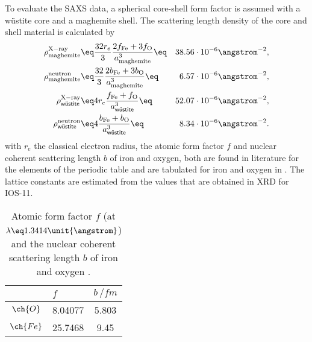 \documentclass[\main/dresen_thesis.tex]{subfiles}
\begin{document}
    To evaluate the SAXS data, a spherical core-shell form factor is assumed with a w\"ustite core and a maghemite shell.
    The scattering length density of the core and shell material is calculated by
    \begin{align}
      \rho^\mathrm{X-ray}_\mathrm{maghemite}   &\eq   \frac{32 r_e}{3}  \frac{2 f_\mathrm{Fe} + 3 f_\mathrm{O}}
                                                                  {a_\mathrm{maghemite}^3}
                                                \eq & 38.56 \cdot 10^{-6} \angstrom^{-2},\\
      \rho^\mathrm{neutron}_\mathrm{maghemite} &\eq   \frac{32}{3} \frac{2 b_\mathrm{Fe} + 3 b_\mathrm{O}}
                                                                  {a_\mathrm{maghemite}^3}
                                                \eq & 6.57 \cdot 10^{-6} \angstrom^{-2},\\
      \rho^\mathrm{X-ray}_\textsf{w\"ustite}   &\eq   4 r_e \frac{f_\mathrm{Fe} + f_\mathrm{O}}
                                                                  {a_\textsf{w\"ustite}^3}
                                                \eq & 52.07 \cdot 10^{-6} \angstrom^{-2},\\
      \rho^\mathrm{neutron}_\textsf{w\"ustite} &\eq   4 \frac{b_\mathrm{Fe} + b_\mathrm{O}}
                                                              {a_\textsf{w\"ustite}^3}
                                                \eq & 8.34 \cdot 10^{-6} \angstrom^{-2}.
    \end{align}
    with $r_e$ the classical electron radius, the  atomic form factor $f$ and nuclear coherent scattering length $b$ of iron and oxygen, both are found in literature for the elements of the periodic table and are tabulated for iron and oxygen in .
    The lattice constants are estimated from the values that are obtained in XRD for IOS-11.
    \begin{table}[ht]
      \centering
      \caption{\label{tab:looselyPackedNS:charMethod:scatteringLenghts}Atomic form factor $f$ (at $\lambda \eq 1.3414 \unit{\angstrom}$) and the nuclear coherent scattering length $b$ of iron and oxygen \cite{Sears_1992_Neutr, BerkeleyLab_1993_asf}.}
      \begin{tabular}{ c | l | c }
                  & $f$       & $b \, / \unit{fm}$ \\
        \hline
        $\ch{O}$  & 8.04077   & 5.803   \\
        $\ch{Fe}$ & 25.7468   & 9.45  \\
        \hline
      \end{tabular}
    \end{table}
\end{document}
